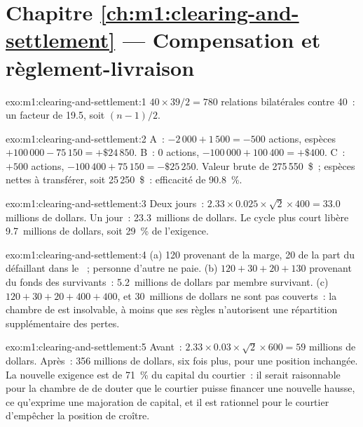 \section*{Chapitre \ref{ch:m1:clearing-and-settlement} --- Compensation et règlement-livraison}

\begin{solution}{exo:m1:clearing-and-settlement:1}
$40\times39/2 = 780$ relations bilatérales contre 40~: un facteur de 19.5,
soit $(n-1)/2$.
\end{solution}

\begin{solution}{exo:m1:clearing-and-settlement:2}
A~: $-2\,000 + 1\,500 = -500$ actions, espèces $+100\,000 - 75\,150 =
+\$24\,850$. B~: $0$ actions, $-100\,000 + 100\,400 = +\$400$. C~: $+500$
actions, $-100\,400 + 75\,150 = -\$25\,250$. Valeur brute de 275\,550~\$~; espèces nettes
à transférer, soit 25\,250~\$~: efficacité de 90.8~\%.
\end{solution}

\begin{solution}{exo:m1:clearing-and-settlement:3}
Deux jours~: $2.33 \times 0.025 \times \sqrt2 \times 400 = 33.0$ millions de dollars. Un
jour~: 23.3~millions de dollars. Le cycle plus court libère 9.7~millions de dollars, soit 29~\% de
l'exigence.
\end{solution}

\begin{solution}{exo:m1:clearing-and-settlement:4}
(a) 120 provenant de la marge, 20 de la part du défaillant dans le ~; personne d'autre
ne paie. (b) $120 + 30 + 20 + 130$ provenant du fonds des survivants~: 5.2~millions de dollars par
membre survivant. (c) $120 + 30 + 20 + 400 + 400$, et 30~millions de dollars
ne sont pas couverts~: la chambre de  est insolvable, à moins que ses règles
n'autorisent une répartition supplémentaire des pertes.
\end{solution}

\begin{solution}{exo:m1:clearing-and-settlement:5}
Avant~: $2.33\times0.03\times\sqrt2\times600 = 59$ millions de dollars. Après~: 356
millions de dollars, six fois plus, pour une position inchangée. La nouvelle exigence est
de 71~\% du capital du courtier~: il serait raisonnable pour la chambre de 
de douter que le courtier puisse financer une nouvelle hausse, ce qu'exprime une
majoration de capital, et il est rationnel pour le courtier d'empêcher la position
de croître.
\end{solution}

